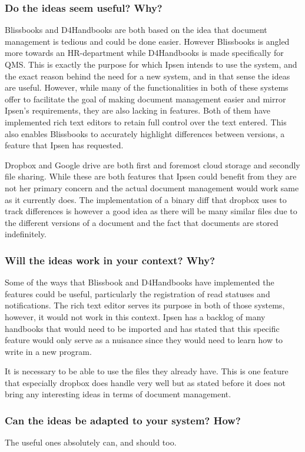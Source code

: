 \subsubsection*{Do the ideas seem useful? Why?}

Blissbooks and D4Handbooks are both based on the idea that document management is tedious and could be done easier.
However Blissbooks is angled more towards an HR-department while D4Handbooks is made specifically for QMS.
This is exactly the purpose for which Ipsen intends to use the system, and the exact reason behind the need for a new system, and in that sense the ideas are useful.
However, while many of the functionalities in both of these systems offer to facilitate the goal of making document management easier and mirror Ipsen's requirements, they are also lacking in features.
Both of them have implemented rich text editors to retain full control over the text entered. 
This also enables Blissbooks to accurately highlight differences between versions, a feature that Ipsen has requested.

Dropbox and Google drive are both first and foremost cloud storage and secondly file sharing. 
While these are both features that Ipsen could benefit from they are not her primary concern and the actual document management would work same as it currently does.
The implementation of a binary diff that dropbox uses to track differences is however a good idea as there will be many similar files due to the different versions of a document and the fact that documents are stored indefinitely.

\subsubsection*{Will the ideas work in your context? Why?}

Some of the ways that Blissbook and D4Handbooks have implemented the features could be useful, particularly the registration of read statuses and notifications.
The rich text editor serves its purpose in both of those systems, however, it would not work in this context.
Ipsen has a backlog of many handbooks that would need to be imported and has stated that this specific feature would only serve as a nuisance since they would need to learn how to write in a new program.

It is necessary to be able to use the files they already have.
This is one feature that especially dropbox does handle very well but as stated before it does not bring any interesting ideas in terms of document management.

\subsubsection*{Can the ideas be adapted to your system? How?}

The useful ones absolutely can, and should too.


